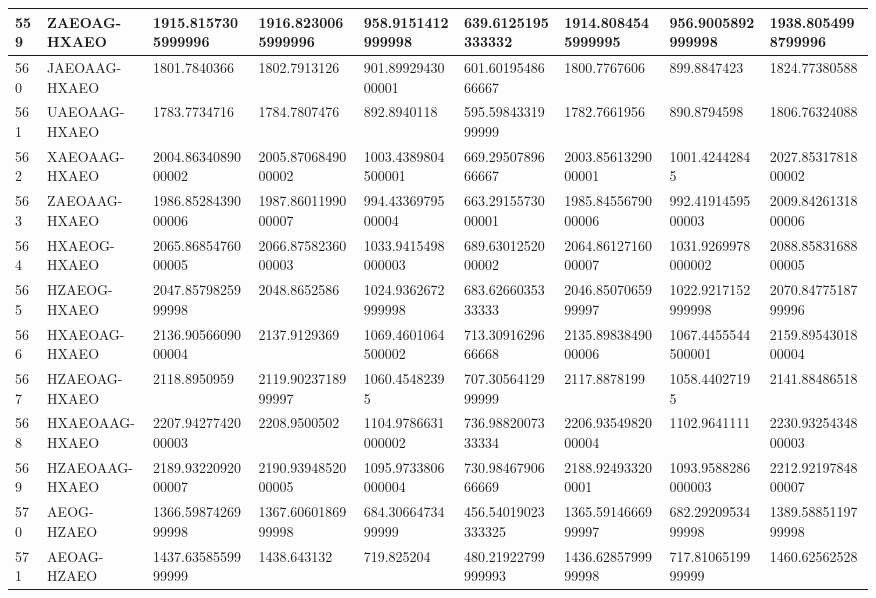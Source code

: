 {\begin{longtable}{|l|l|l|l|l|l|l|l|l|}
        559 & ZAEOAG-HXAEO & 1915.8157305999996 & 1916.8230065999996 & 958.9151412999998 & 639.6125195333332 & 1914.8084545999995 & 956.9005892999998 & 1938.8054998799996 \\ \hline
        560 & JAEOAAG-HXAEO & 1801.7840366 & 1802.7913126 & 901.8992943000001 & 601.6019548666667 & 1800.7767606 & 899.8847423 & 1824.77380588 \\ \hline
        561 & UAEOAAG-HXAEO & 1783.7734716 & 1784.7807476 & 892.8940118 & 595.5984331999999 & 1782.7661956 & 890.8794598 & 1806.76324088 \\ \hline
        562 & XAEOAAG-HXAEO & 2004.8634089000002 & 2005.8706849000002 & 1003.4389804500001 & 669.2950789666667 & 2003.8561329000001 & 1001.42442845 & 2027.8531781800002 \\ \hline
        563 & ZAEOAAG-HXAEO & 1986.8528439000006 & 1987.8601199000007 & 994.4336979500004 & 663.2915573000001 & 1985.8455679000006 & 992.4191459500003 & 2009.8426131800006 \\ \hline
        564 & HXAEOG-HXAEO & 2065.8685476000005 & 2066.8758236000003 & 1033.9415498000003 & 689.6301252000002 & 2064.8612716000007 & 1031.9269978000002 & 2088.8583168800005 \\ \hline
        565 & HZAEOG-HXAEO & 2047.8579825999998 & 2048.8652586 & 1024.9362672999998 & 683.6266035333333 & 2046.8507065999997 & 1022.9217152999998 & 2070.8477518799996 \\ \hline
        566 & HXAEOAG-HXAEO & 2136.9056609000004 & 2137.9129369 & 1069.4601064500002 & 713.3091629666668 & 2135.8983849000006 & 1067.4455544500001 & 2159.8954301800004 \\ \hline
        567 & HZAEOAG-HXAEO & 2118.8950959 & 2119.9023718999997 & 1060.45482395 & 707.3056412999999 & 2117.8878199 & 1058.44027195 & 2141.88486518 \\ \hline
        568 & HXAEOAAG-HXAEO & 2207.9427742000003 & 2208.9500502 & 1104.9786631000002 & 736.9882007333334 & 2206.9354982000004 & 1102.9641111 & 2230.9325434800003 \\ \hline
        569 & HZAEOAAG-HXAEO & 2189.9322092000007 & 2190.9394852000005 & 1095.9733806000004 & 730.9846790666669 & 2188.924933200001 & 1093.9588286000003 & 2212.9219784800007 \\ \hline
        570 & AEOG-HZAEO & 1366.5987426999998 & 1367.6060186999998 & 684.3066473499999 & 456.54019023333325 & 1365.5914666999997 & 682.2920953499998 & 1389.5885119799998 \\ \hline
        571 & AEOAG-HZAEO & 1437.6358559999999 & 1438.643132 & 719.825204 & 480.21922799999993 & 1436.6285799999998 & 717.8106519999999 & 1460.62562528 \\ \hline

\end{longtable}}
